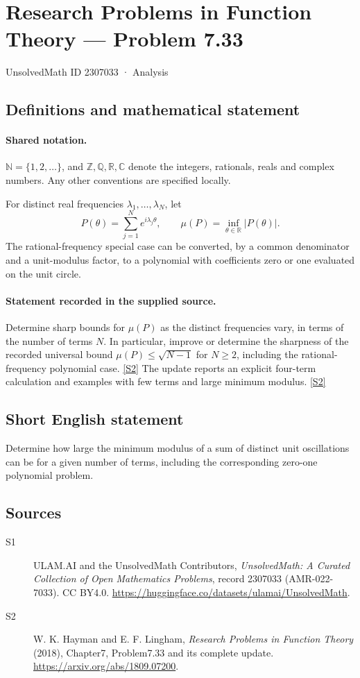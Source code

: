\documentclass[11pt]{article}
\newcommand{\sref}[2]{\hyperlink{source:#1:#2}{[S#2]}}
\begin{document}
\setcounter{section}{2307032}
\section{Research Problems in Function Theory — Problem 7.33}\label{2307033}
{\small\sffamily UnsolvedMath ID 2307033 · Analysis}
\subsection{Definitions and mathematical statement}

\paragraph{Shared notation.}$\mathbb N=\{1,2,\ldots\}$, and $\mathbb Z,\mathbb Q,\mathbb R,\mathbb C$ denote the integers, rationals, reals and complex numbers. Any other conventions are specified locally.


For distinct real frequencies $\lambda_1,\ldots,\lambda_N$, let
\[P(\theta)=\sum_{j=1}^N e^{i\lambda_j\theta},\qquad
\mu(P)=\inf_{\theta\in\mathbb R}|P(\theta)|.\]
The rational-frequency special case can be converted, by a common denominator and a unit-modulus factor, to a polynomial with coefficients zero or one evaluated on the unit circle.

\paragraph{Statement recorded in the supplied source.}
Determine sharp bounds for $\mu(P)$ as the distinct frequencies vary, in terms of the number of terms $N$. In particular, improve or determine the sharpness of the recorded universal bound $\mu(P)\le\sqrt{N-1}$ for $N\ge2$, including the rational-frequency polynomial case. \sref{2307033}{2}
The update reports an explicit four-term calculation and examples with few terms and large minimum modulus. \sref{2307033}{2}
\subsection{Short English statement}
Determine how large the minimum modulus of a sum of distinct unit oscillations can be for a given number of terms, including the corresponding zero-one polynomial problem.
\subsection{Sources}
\begin{description}
\item[\hypertarget{source:2307033:1}{S1}] ULAM.AI and the UnsolvedMath Contributors, \emph{UnsolvedMath: A Curated Collection of Open Mathematics Problems}, record 2307033 (AMR-022-7033). CC BY4.0. \url{https://huggingface.co/datasets/ulamai/UnsolvedMath}.
\item[\hypertarget{source:2307033:2}{S2}] W. K. Hayman and E. F. Lingham, \emph{Research Problems in Function Theory} (2018), Chapter7, Problem7.33 and its complete update. \url{https://arxiv.org/abs/1809.07200}.
\end{description}
\label{end:2307033}
\end{document}
